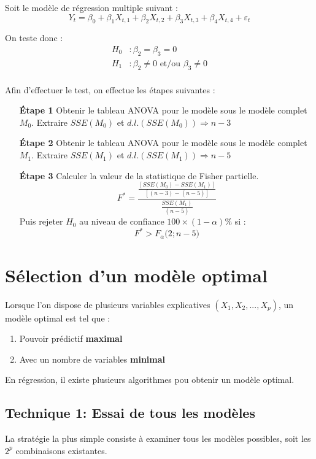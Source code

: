 \documentclass[11pt,french]{report}
\begin{document}
Soit le modèle de régression multiple suivant :
$$
Y_t = \beta_0 + \beta_1X_{t,1} + \beta_2X_{t,2} + \beta_3X_{t,3} + \beta_4X_{t,4} + \varepsilon_t
$$

On teste donc :
\begin{align*}
H_0 &: \beta_2 = \beta_3 = 0 \\
H_1 &: \beta_2 \neq 0 \text{ et/ou } \beta_3 \neq 0 \\
\end{align*}

Afin d'effectuer le test, on effectue les étapes suivantes :
\begin{itemize}
\item[\textbf{Étape 1}] Obtenir le tableau ANOVA pour le modèle sous le modèle complet $M_0$. Extraire $SSE(M_0)$ et $d.l.(SSE(M_0)) \Rightarrow n - 3$

\item[\textbf{Étape 2}] Obtenir le tableau ANOVA pour le modèle sous le modèle complet $M_1$. Extraire $SSE(M_1)$ et $d.l.(SSE(M_1)) \Rightarrow n - 5$ 

\item[\textbf{Étape 3}] Calculer la valeur de la statistique de Fisher partielle.
$$
F^* = \frac{\frac{[SSE(M_0) - SSE(M_1)]}{[(n-3) - (n-5)]}}{\frac{SSE(M_1)}{(n-5)}}
$$
Puis rejeter $H_0$ au niveau de confiance $100 \times (1 - \alpha)\%$ si :
$$
F^* > F_{\alpha}\Big( 2; n-5 \Big)
$$
\end{itemize}

\section{Sélection d'un modèle optimal}
\label{sec:optimal}
Lorsque l'on dispose de plusieurs variables explicatives $(X_1,X_2,...,X_p)$, un modèle optimal est tel que :
\begin{enumerate}
\item Pouvoir prédictif \textbf{maximal}
\item Avec un nombre de variables \textbf{minimal}
\end{enumerate}
En régression, il existe plusieurs algorithmes pou obtenir un modèle optimal.

\subsection{Technique 1: Essai de tous les modèles}
\label{tech1}

La stratégie la plus simple consiste à examiner tous les modèles possibles, soit les $2^p$ combinaisons existantes. \newline
\end{document}
